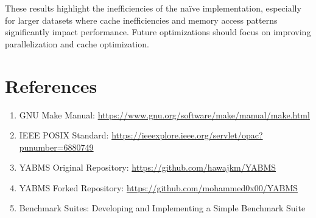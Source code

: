 \documentclass[12pt]{article}
\begin{document}
These results highlight the inefficiencies of the naïve implementation, especially for larger datasets where cache inefficiencies and memory access patterns significantly impact performance. Future optimizations should focus on improving parallelization and cache optimization.

\section{References}
\begin{enumerate}
    \item GNU Make Manual: \url{https://www.gnu.org/software/make/manual/make.html}
    \item IEEE POSIX Standard: \url{https://ieeexplore.ieee.org/servlet/opac?punumber=6880749}
    \item YABMS Original Repository: \url{https://github.com/hawajkm/YABMS}
    \item YABMS Forked Repository: \url{https://github.com/mohammed0x00/YABMS}
    \item Benchmark Suites: Developing and Implementing a Simple Benchmark Suite
\end{enumerate}
\end{document}
